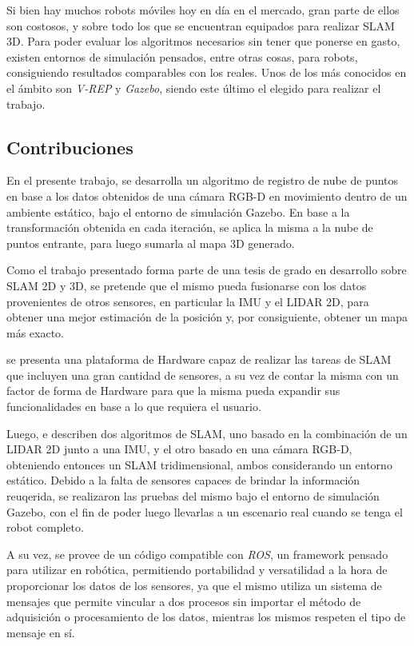 Si bien hay muchos robots móviles hoy en día en el mercado, gran parte de ellos son costosos, y sobre todo los que se encuentran equipados para realizar SLAM 3D. Para poder evaluar los algoritmos necesarios sin tener que ponerse en gasto, existen entornos de simulación pensados, entre otras cosas, para robots, consiguiendo resultados comparables con los reales. Unos de los más conocidos en el ámbito son \textit{V-REP} y \textit{Gazebo}, siendo este último el elegido para realizar el trabajo.

\subsection{Contribuciones}
En el presente trabajo, 
\ifimagenes
se desarrolla un algoritmo de registro de nube de puntos en base a los datos obtenidos de una cámara RGB-D en movimiento dentro de un ambiente estático, bajo el entorno de simulación Gazebo. En base a la transformación obtenida en cada iteración, se aplica la misma a la nube de puntos entrante, para luego sumarla al mapa 3D generado.

Como el trabajo presentado forma parte de una tesis de grado en desarrollo sobre SLAM 2D y 3D, se pretende que el mismo pueda fusionarse con los datos provenientes de otros sensores, en particular la IMU y el LIDAR 2D, para obtener una mejor estimación de la posición y, por consiguiente, obtener un mapa más exacto.

\else
se presenta una plataforma de Hardware capaz de realizar las tareas de SLAM que incluyen una gran cantidad de sensores, a su vez de contar la misma con un factor de forma de Hardware para que la misma pueda expandir sus funcionalidades en base a lo que requiera el usuario.

Luego, e describen dos algoritmos de SLAM, uno basado en la combinación de un LIDAR 2D junto a una IMU, y el otro basado en una cámara RGB-D, obteniendo entonces un SLAM tridimensional, ambos considerando un entorno estático. Debido a la falta de sensores capaces de brindar la información reuqerida, se realizaron las pruebas del mismo bajo el entorno de simulación Gazebo, con el fin de poder luego llevarlas a un escenario real cuando se tenga el robot completo.
\fi

A su vez, se provee de un código compatible con \textit{ROS}, un framework pensado para utilizar en robótica, permitiendo portabilidad y versatilidad a la hora de proporcionar los datos de los sensores, ya que el mismo utiliza un sistema de mensajes que permite vincular a dos procesos sin importar el método de adquisición o procesamiento de los datos, mientras los mismos respeten el tipo de mensaje en sí.

